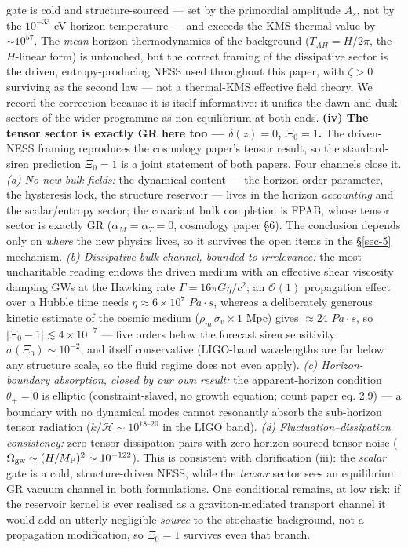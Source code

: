 \documentclass[aps,prd,preprint,nofootinbib,superscriptaddress]{revtex4-2}
\begin{document}
gate is cold and structure-sourced --- set by the primordial amplitude
\(A_s\), not by the \(10^{-33}\) eV horizon temperature --- and exceeds
the KMS-thermal value by \(\sim 10^{57}\). The \emph{mean} horizon
thermodynamics of the background (\(T_{AH} = H/2\pi\), the \(H\)-linear
form) is untouched, but the correct framing of the dissipative sector is
the driven, entropy-producing NESS used throughout this paper, with
\(\zeta > 0\) surviving as the second law --- not a thermal-KMS
effective field theory. We record the correction because it is itself
informative: it unifies the dawn and dusk sectors of the wider programme
as non-equilibrium at both ends. \textbf{(iv) The tensor sector is
exactly GR here too --- \(\delta(z) = 0\), \(\Xi_0 = 1\).} The
driven-NESS framing reproduces the cosmology paper's tensor result, so
the standard-siren prediction \(\Xi_0 = 1\) is a joint statement of both
papers. Four channels close it. \emph{(a) No new bulk fields:} the
dynamical content --- the horizon order parameter, the hysteresis lock,
the structure reservoir --- lives in the horizon \emph{accounting} and
the scalar/entropy sector; the covariant bulk completion is FPAB, whose
tensor sector is exactly GR (\(\alpha_M = \alpha_T = 0\), cosmology
paper §6). The conclusion depends only on \emph{where} the new physics
lives, so it survives the open items in the §\ref{sec-5} mechanism.
\emph{(b) Dissipative bulk channel, bounded to irrelevance:} the most
uncharitable reading endows the driven medium with an effective shear
viscosity damping GWs at the Hawking rate \(\Gamma = 16\pi G\eta/c^2\);
an \(\mathcal{O}(1)\) propagation effect over a Hubble time needs
\(\eta \approx 6\times10^{7}\) \(Pa\cdot s\), whereas a deliberately
generous kinetic estimate of the cosmic medium
(\(\rho_m\,\sigma_v \times 1\) Mpc) gives \(\approx 24\) \(Pa\cdot s\),
so \(|\Xi_0 - 1| \lesssim 4\times10^{-7}\) --- five orders below the
forecast siren sensitivity \(\sigma(\Xi_0)\sim10^{-2}\), and itself
conservative (LIGO-band wavelengths are far below any structure scale,
so the fluid regime does not even apply). \emph{(c) Horizon-boundary
absorption, closed by our own result:} the apparent-horizon condition
\(\theta_+ = 0\) is elliptic (constraint-slaved, no growth equation;
count paper eq. 2.9) --- a boundary with no dynamical modes cannot
resonantly absorb the sub-horizon tensor radiation
(\(k/\mathcal{H}\sim10^{18\text{–}20}\) in the LIGO band). \emph{(d)
Fluctuation--dissipation consistency:} zero tensor dissipation pairs
with zero horizon-sourced tensor noise
(\(\Omega_{\rm gw}\sim(H/M_{\rm P})^2\sim10^{-122}\)). This is
consistent with clarification (iii): the \emph{scalar} gate is a cold,
structure-driven NESS, while the \emph{tensor} sector sees an
equilibrium GR vacuum channel in both formulations. One conditional
remains, at low risk: if the reservoir kernel is ever realised as a
graviton-mediated transport channel it would add an utterly negligible
\emph{source} to the stochastic background, not a propagation
modification, so \(\Xi_0 = 1\) survives even that branch.
\end{document}
